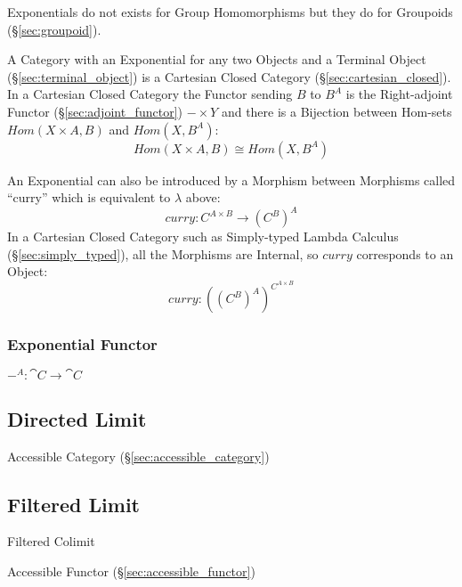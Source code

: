 Exponentials do not exists for Group Homomorphisms but they do for
Groupoids (\S\ref{sec:groupoid}).

A Category with an Exponential for any two Objects and a Terminal
Object (\S\ref{sec:terminal_object}) is a Cartesian Closed Category
(\S\ref{sec:cartesian_closed}). In a Cartesian Closed Category the
Functor sending $B$ to $B^A$ is the Right-adjoint Functor
(\S\ref{sec:adjoint_functor}) $- \times Y$ and there is a Bijection
between Hom-sets $Hom(X \times A, B)$ and $Hom(X, B^A)$:
\[
  Hom(X \times A, B) \cong Hom(X, B^A)
\]

An Exponential can also be introduced by a Morphism between Morphisms
called ``curry'' which is equivalent to $\lambda$ above:
\[
  curry : C^{A \times B} \rightarrow (C^B)^A
\]
In a Cartesian Closed Category such as Simply-typed Lambda Calculus
(\S\ref{sec:simply_typed}), all the Morphisms are Internal, so $curry$
corresponds to an Object:
\[
  curry : ((C^B)^A)^{C^{A \times B}}
\]



\subsubsection{Exponential Functor}\label{sec:exponential_functor}

$-^A : \cat{C} \rightarrow \cat{C}$



\subsection{Directed Limit}\label{sec:directed_limit}

Accessible Category (\S\ref{sec:accessible_category})



\subsection{Filtered Limit}\label{sec:filtered_limit}

Filtered Colimit

Accessible Functor (\S\ref{sec:accessible_functor})



